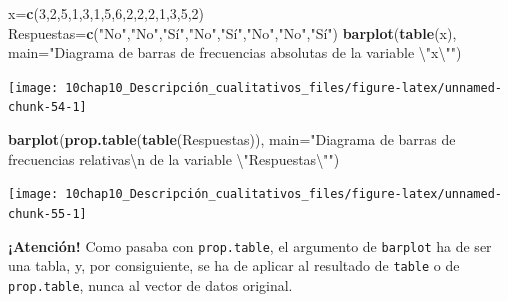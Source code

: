 \documentclass[
]{book}
\newenvironment{Shaded}{\begin{snugshade}}{\end{snugshade}}
\newcommand{\CharTok}[1]{\textcolor[rgb]{0.31,0.60,0.02}{#1}}
\newcommand{\DataTypeTok}[1]{\textcolor[rgb]{0.13,0.29,0.53}{#1}}
\newcommand{\DecValTok}[1]{\textcolor[rgb]{0.00,0.00,0.81}{#1}}
\newcommand{\KeywordTok}[1]{\textcolor[rgb]{0.13,0.29,0.53}{\textbf{#1}}}
\newcommand{\NormalTok}[1]{#1}
\newcommand{\StringTok}[1]{\textcolor[rgb]{0.31,0.60,0.02}{#1}}
\theoremstyle{definition}
\theoremstyle{definition}
\theoremstyle{definition}
\theoremstyle{remark}
\begin{document}
\begin{Shaded}
\begin{Highlighting}[]
\NormalTok{x=}\KeywordTok{c}\NormalTok{(}\DecValTok{3}\NormalTok{,}\DecValTok{2}\NormalTok{,}\DecValTok{5}\NormalTok{,}\DecValTok{1}\NormalTok{,}\DecValTok{3}\NormalTok{,}\DecValTok{1}\NormalTok{,}\DecValTok{5}\NormalTok{,}\DecValTok{6}\NormalTok{,}\DecValTok{2}\NormalTok{,}\DecValTok{2}\NormalTok{,}\DecValTok{2}\NormalTok{,}\DecValTok{1}\NormalTok{,}\DecValTok{3}\NormalTok{,}\DecValTok{5}\NormalTok{,}\DecValTok{2}\NormalTok{)}
\NormalTok{Respuestas=}\KeywordTok{c}\NormalTok{(}\StringTok{"No"}\NormalTok{,}\StringTok{"No"}\NormalTok{,}\StringTok{"Sí"}\NormalTok{,}\StringTok{"No"}\NormalTok{,}\StringTok{"Sí"}\NormalTok{,}\StringTok{"No"}\NormalTok{,}\StringTok{"No"}\NormalTok{,}\StringTok{"Sí"}\NormalTok{)}
\KeywordTok{barplot}\NormalTok{(}\KeywordTok{table}\NormalTok{(x), }\DataTypeTok{main=}\StringTok{"Diagrama de barras de frecuencias absolutas de la variable }\CharTok{\textbackslash{}"}\StringTok{x}\CharTok{\textbackslash{}"}\StringTok{"}\NormalTok{)}
\end{Highlighting}
\end{Shaded}

\begin{center}\texttt{[image: 10chap10\_Descripción\_cualitativos\_files/figure-latex/unnamed-chunk-54-1]} \end{center}

\begin{Shaded}
\begin{Highlighting}[]
\KeywordTok{barplot}\NormalTok{(}\KeywordTok{prop.table}\NormalTok{(}\KeywordTok{table}\NormalTok{(Respuestas)), }
        \DataTypeTok{main=}\StringTok{"Diagrama de barras de frecuencias relativas}\CharTok{\textbackslash{}n}\StringTok{ de la variable }\CharTok{\textbackslash{}"}\StringTok{Respuestas}\CharTok{\textbackslash{}"}\StringTok{"}\NormalTok{)}
\end{Highlighting}
\end{Shaded}

\begin{center}\texttt{[image: 10chap10\_Descripción\_cualitativos\_files/figure-latex/unnamed-chunk-55-1]} \end{center}

\textbf{¡Atención!} Como pasaba con \texttt{prop.table}, el argumento de \texttt{barplot} ha de ser una tabla, y, por consiguiente, se ha de aplicar al resultado de \texttt{table} o de \texttt{prop.table}, nunca al vector de datos original.
\end{document}
